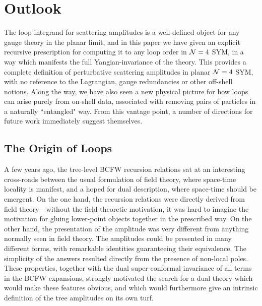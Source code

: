 \documentclass[11pt, reqno]{article}
\begin{document}
%
\section{Outlook}\label{outlook}

The loop integrand for scattering amplitudes is a well-defined object for any gauge theory in the planar limit, and in this paper we have given an explicit recursive prescription for computing it to any loop order in ${\cal N}=4$ SYM, in a way which manifests the full Yangian-invariance of the theory. This provides a complete definition of perturbative scattering amplitudes in planar ${\cal N}=4$ SYM, with no reference to the Lagrangian, gauge redundancies or other off-shell notions. Along the way, we have also seen a new physical picture for how loops can arise purely from on-shell data, associated with removing pairs of particles in a naturally ``entangled" way. From this vantage point, a number of directions for future work immediately suggest themselves.


\subsection{The Origin of Loops}

A few years ago, the tree-level BCFW recursion relations sat at an interesting cross-roads between the usual formulation of field theory, where space-time locality is manifest, and a hoped for dual description, where space-time should be emergent. On the one hand, the recursion relations were directly derived from field theory---without the field-theoretic motivation, it was hard to imagine the motivation for gluing lower-point objects together in the prescribed way. On the other hand, the presentation of the amplitude was very different from anything normally seen in  field theory. The amplitudes could be presented in many different forms, with remarkable identities guaranteeing their equivalence. The simplicity of the answers resulted directly from the presence of non-local poles. These properties, together with the dual super-conformal invariance of all terms in the BCFW expansions, strongly motivated the search for a dual theory which would make these features obvious, and which would furthermore give an intrinsic definition of the tree amplitudes on its own turf.
\end{document}
